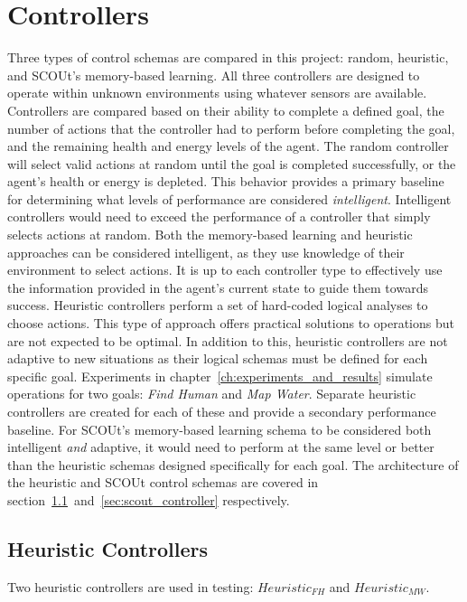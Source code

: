 
\chapter{Controllers} \label{ch:controllers}
Three types of control schemas are compared in this project: random, heuristic, and SCOUt's memory-based learning.
All three controllers are designed to operate within unknown environments using whatever sensors are available.
Controllers are compared based on their ability to complete a defined goal, the number of actions that the controller had to perform before completing the goal, and the remaining health and energy levels of the agent.
The random controller will select valid actions at random until the goal is completed successfully, or the agent's health or energy is depleted.
This behavior provides a primary baseline for determining what levels of performance are considered \textit{intelligent}.
Intelligent controllers would need to exceed the performance of a controller that simply selects actions at random.
Both the memory-based learning and heuristic approaches can be considered intelligent, as they use knowledge of their environment to select actions.
It is up to each controller type to effectively use the information provided in the agent's current state to guide them towards success.
Heuristic controllers perform a set of hard-coded logical analyses to choose actions.
This type of approach offers practical solutions to operations but are not expected to be optimal.
In addition to this, heuristic controllers are not adaptive to new situations as their logical schemas must be defined for each specific goal.
Experiments in chapter~\ref{ch:experiments_and_results} simulate operations for two goals: \textit{Find Human} and \textit{Map Water}.
Separate heuristic controllers are created for each of these and provide a secondary performance baseline.
For SCOUt's memory-based learning schema to be considered both intelligent \textit{and} adaptive, it would need to perform at the same level or better than the heuristic schemas designed specifically for each goal.
The architecture of the heuristic and SCOUt control schemas are covered in section~\ref{sec:heuristic_controllers}~and~\ref{sec:scout_controller} respectively.


\section{Heuristic Controllers} \label{sec:heuristic_controllers}
Two heuristic controllers are used in testing: $Heuristic_{FH}$ and $Heuristic_{MW}$.

